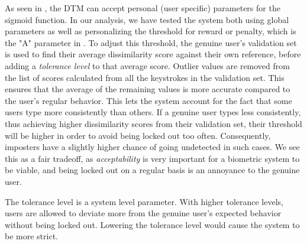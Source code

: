 As seen in , the DTM can accept personal (user specific) parameters for the sigmoid function.
In our analysis, we have tested the system both using global parameters as well as personalizing the threshold for reward or penalty, which is the "A" parameter in .
To adjust this threshold, the genuine user's validation set is used to find their average dissimilarity score against their own reference, before adding a \textit{tolerance level} to that average score.
Outlier values are removed from the list of scores calculated from all the keystrokes in the validation set.
This ensures that the average of the remaining values is more accurate compared to the user's regular behavior.
This lets the system account for the fact that some users type more consistently than others.
If a genuine user types less consistently, thus achieving higher dissimilarity scores from their validation set, their threshold will be higher in order to avoid being locked out too often.
Consequently, imposters have a slightly higher chance of going undetected in such cases.
We see this as a fair tradeoff, as \textit{acceptability} is very important for a biometric system to be viable, and being locked out on a regular basis is an annoyance to the genuine user.

The tolerance level is a system level parameter.
With higher tolerance levels, users are allowed to deviate more from the genuine user's expected behavior without being locked out.
Lowering the tolerance level would cause the system to be more strict.

